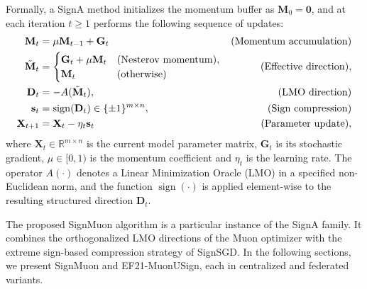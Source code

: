 \documentclass[letterpaper]{article} %
\begin{document}
Formally, a SignA method initializes the momentum buffer as $\mathbf{M}_0 = \mathbf{0}$, and at each iteration $t \ge 1$ performs the following sequence of updates:
\begin{equation}
\label{eq:signa_general}
\resizebox{0.98\columnwidth}{!}{\(\displaystyle
\begin{aligned}
\mathbf{M}_t &= \mu \mathbf{M}_{t-1} + \mathbf{G}_t & \text{(Momentum accumulation)}\\
\tilde{\mathbf{M}}_t &=
\begin{cases}
    \mathbf{G}_t + \mu \mathbf{M}_t & \text{(Nesterov momentum)}, \\
    \mathbf{M}_t & \text{(otherwise)}
\end{cases} & \text{(Effective direction)}, \\
\mathbf{D}_t &= -A(\tilde{\mathbf{M}}_t), & \text{(LMO direction)} \\
\mathbf{s}_t &= \operatorname{sign}(\mathbf{D}_t) \in \{\pm 1\}^{m \times n},  & \text{(Sign compression)}\\
\mathbf{X}_{t+1} &= \mathbf{X}_t - \eta_t \mathbf{s}_t & \text{(Parameter update)},
\end{aligned}\)}
\end{equation}
where $\mathbf{X}_t \in \mathbb{R}^{m \times n}$ is the current model parameter matrix, $\mathbf{G}_t$ is its stochastic gradient, $\mu \in [0, 1)$ is the momentum coefficient and $\eta_t$ is the learning rate. The operator $A(\cdot)$ denotes a Linear Minimization Oracle (LMO) in a specified non-Euclidean norm, and the function $\operatorname{sign}(\cdot)$ is applied element-wise to the resulting structured direction $\mathbf{D}_t$.

The proposed SignMuon algorithm is a particular instance of the SignA family. It combines the orthogonalized LMO directions of the Muon optimizer with the extreme sign-based compression strategy of SignSGD. In the following sections, we present SignMuon and EF21-MuonUSign, each in centralized and federated variants.
\end{document}
